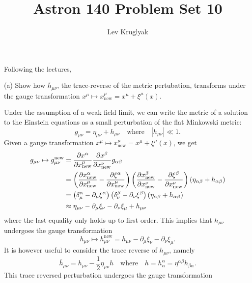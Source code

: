 \documentclass{../../templates/lkx_pset}
\title{Astron 140 Problem Set 10}
\author{Lev Kruglyak}
\begin{document}
\maketitle

\begin{problem}{1}
  Following the lectures,
\end{problem}

\begin{parts}
  \begin{part}{(a)}
    Show how $\overline{h}_{\mu\nu}$, the trace-reverse of the metric pertubation, transforms under the gauge transformation $x^\mu \mapsto x^\mu_{\textrm{new}} = x^\mu + \xi^\mu(x)$.
  \end{part}

  Under the assumption of a weak field limit, we can write the metric of a solution to the Einstein equations as a small perturbation of the flat Minkowski metric:
  \[
    g_{\mu\nu} = \eta_{\mu\nu} + h_{\mu\nu}\quad\textrm{where}\quad |h_{\mu\nu}| \ll 1.
  \]
  Given a gauge transformation $x^{\mu} \mapsto x^\mu_{\textrm{new}} = x^\mu + \xi^\mu(x)$, we get
  \[
    \begin{aligned}
      g_{\mu\nu} \mapsto g_{\mu\nu}^{\textrm{new}} 
      &= \frac{\partial x^\alpha}{\partial x^\mu_{\textrm{new}}}\frac{\partial x^\beta}{\partial x^{\nu}_{\textrm{new}}} g_{\alpha\beta}\\
      &= 
      \left( \frac{\partial x^\alpha_{\textrm{new}}}{\partial x^{\mu}_{\textrm{new}}} - \frac{\partial \xi^\alpha}{\partial x^{\mu}_{\textrm{new}}} \right)
      \left( \frac{\partial x^\beta_{\textrm{new}}}{\partial x^{\nu}_{\textrm{new}}} - \frac{\partial \xi^\beta}{\partial x^{\nu}_{\textrm{new}}} \right) (\eta_{\alpha\beta} + h_{\alpha\beta})\\
      &= \left( \delta^{\alpha}_\mu - \partial_\mu \xi^\alpha\right)
      \left( \delta^\beta_\nu -\partial_\nu \xi^\beta\right)(\eta_{\alpha\beta} + h_{\alpha\beta})\\
      &\approx \eta_{\mu\nu}-\partial_\mu \xi_\nu - \partial_\nu \xi_\mu + h_{\mu\nu}
    \end{aligned}
  \]
  where the last equality only holds up to first order. This implies that $h_{\mu\nu}$ undergoes the gauge transformation
  \[
    h_{\mu\nu} \mapsto h_{\mu\nu}^{\textrm{new}} = h_{\mu\nu} - \partial_\mu \xi_\nu - \partial_\nu \xi_\mu.
  \]
  It is however useful to consider the trace reverse of $h_{\mu\nu}$, namely \[\overline{h}_{\mu\nu} = h_{\mu\nu}- \frac{1}{2}\eta_{\mu\nu} h\quad\textrm{where}\quad h = h^{\alpha}_\alpha = \eta^{\alpha\beta}h_{\beta\alpha}.\]
  This trace reversed perturbation undergoes the gauge transformation

\end{parts}
\end{document}
